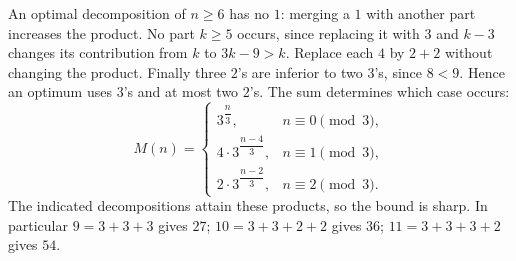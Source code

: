 An optimal decomposition of $n\ge6$ has no $1$: merging a $1$ with another part increases the product. No part $k\ge5$ occurs, since replacing it with $3$ and $k-3$ changes its contribution from $k$ to $3k-9>k$. Replace each $4$ by $2+2$ without changing the product. Finally three $2$'s are inferior to two $3$'s, since $8<9$. Hence an optimum uses $3$'s and at most two $2$'s. The sum determines which case occurs:
\[
\boxed{M(n)=
\begin{cases}
3^{\dfrac{n}{3}},&n\equiv0\pmod3,\\
4\cdot3^{\dfrac{n-4}{3}},&n\equiv1\pmod3,\\
2\cdot3^{\dfrac{n-2}{3}},&n\equiv2\pmod3.
\end{cases}}
\]
The indicated decompositions attain these products, so the bound is sharp. In particular $9=3+3+3$ gives $\boxed{27}$; $10=3+3+2+2$ gives $\boxed{36}$; $11=3+3+3+2$ gives $\boxed{54}$.

